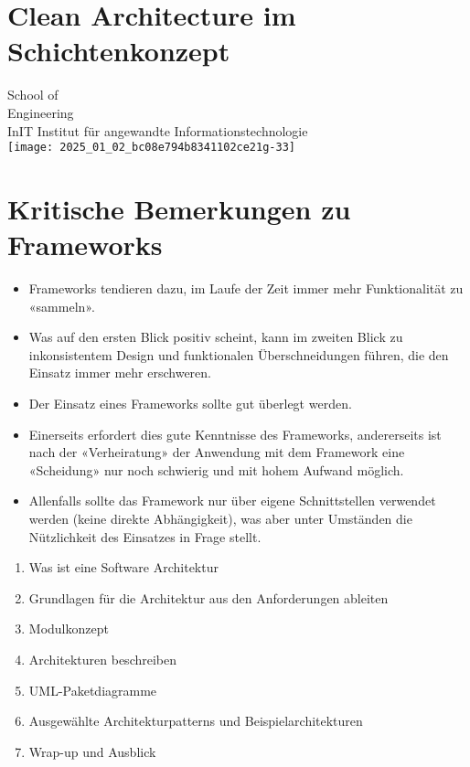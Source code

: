 \documentclass[10pt]{article}
\begin{document}
\section*{Clean Architecture im Schichtenkonzept}
School of\\
Engineering\\
InIT Institut für angewandte Informationstechnologie\\
\texttt{[image: 2025\_01\_02\_bc08e794b8341102ce21g-33]}

\section*{Kritische Bemerkungen zu Frameworks}
\begin{itemize}
  \item Frameworks tendieren dazu, im Laufe der Zeit immer mehr Funktionalität zu «sammeln».
  \item Was auf den ersten Blick positiv scheint, kann im zweiten Blick zu inkonsistentem Design und funktionalen Überschneidungen führen, die den Einsatz immer mehr erschweren.
  \item Der Einsatz eines Frameworks sollte gut überlegt werden.
  \item Einerseits erfordert dies gute Kenntnisse des Frameworks, andererseits ist nach der «Verheiratung» der Anwendung mit dem Framework eine «Scheidung» nur noch schwierig und mit hohem Aufwand möglich.
  \item Allenfalls sollte das Framework nur über eigene Schnittstellen verwendet werden (keine direkte Abhängigkeit), was aber unter Umständen die Nützlichkeit des Einsatzes in Frage stellt.
\end{itemize}

\begin{enumerate}
  \item Was ist eine Software Architektur
  \item Grundlagen für die Architektur aus den Anforderungen ableiten
  \item Modulkonzept
  \item Architekturen beschreiben
  \item UML-Paketdiagramme
  \item Ausgewählte Architekturpatterns und Beispielarchitekturen
  \item Wrap-up und Ausblick
\end{enumerate}
\end{document}
